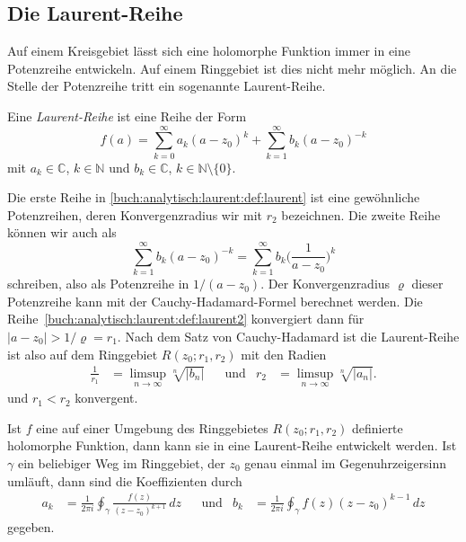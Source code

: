 %
%
%
\subsection{Die Laurent-Reihe}
Auf einem Kreisgebiet lässt sich eine holomorphe Funktion immer in eine
Potenzreihe entwickeln.
Auf einem Ringgebiet ist dies nicht mehr möglich.
An die Stelle der Potenzreihe tritt ein sogenannte Laurent-Reihe.

\begin{definition}
\label{buch:analytisch:laurent:def:laurentreihe}
Eine \emph{Laurent-Reihe} ist eine Reihe der Form
%
\begin{equation}
f(a)
=
\sum_{k=0}^\infty a_k(a-z_0)^k
+
\sum_{k=1}^\infty b_k(a-z_0)^{-k}
\label{buch:analytisch:laurent:def:laurent}
\end{equation}
mit $a_k\in\mathbb{C}$, $k\in\mathbb{N}$ und $b_k\in\mathbb{C}$,
$k\in\mathbb{N}\setminus\{0\}$.
\end{definition}

Die erste Reihe in
\eqref{buch:analytisch:laurent:def:laurent}
ist eine gewöhnliche Potenzreihen, deren Konvergenzradius wir mit $r_2$
bezeichnen.
Die zweite Reihe können wir auch als
\begin{equation}
\sum_{k=1}^\infty b_k(a-z_0)^{-k}
=
\sum_{k=1}^\infty b_k\biggl(\frac{1}{a-z_0}\biggr)^{k}
\label{buch:analytisch:laurent:def:laurent2}
\end{equation}
schreiben, also als Potenzreihe in $1/(a-z_0)$.
Der Konvergenzradius $\varrho$ dieser Potenzreihe kann mit der
Cauchy-Hadamard-Formel berechnet werden.
Die Reihe~\eqref{buch:analytisch:laurent:def:laurent2}
konvergiert dann für $|a-z_0| > 1/\varrho = r_1$.
Nach dem Satz von Cauchy-Hadamard ist die Laurent-Reihe ist also 
auf dem Ringgebiet $R(z_0;r_1,r_2)$ mit den Radien
\begin{align*}
\frac{1}{r_1}
&=
\limsup_{n\to\infty}\!\sqrt[n]{|b_n|}
&&\text{und}&
r_2
&=
\limsup_{n\to\infty}\!\sqrt[n]{|a_n|}.
\end{align*}
und $r_1 < r_2$ konvergent.

\begin{satz}
\label{buch:analytisch:laurent:satz:laurentreihe}
Ist $f$ eine auf einer Umgebung des Ringgebietes $R(z_0;r_1,r_2)$ definierte
holomorphe Funktion, dann kann sie in eine Laurent-Reihe entwickelt werden.
Ist $\gamma$ ein beliebiger Weg im Ringgebiet, der $z_0$ genau einmal
im Gegenuhrzeigersinn umläuft, dann sind die 
Koeffizienten durch
\begin{align}
a_k
&=
\frac{1}{2\pi i}
\oint_{\gamma} 
\frac{f(z)}{(z-z_0)^{k+1}}
\,dz
&&\text{und}&
b_k
&=
\frac{1}{2\pi i}
\oint_{\gamma} 
f(z)(z-z_0)^{k-1}
\,dz
\label{buch:analytisch:laurent:eqn:laurentkoeffizienten}
\end{align}
gegeben.
\end{satz}

